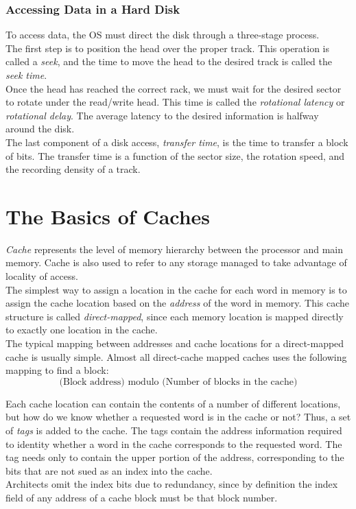 \documentclass[12pt]{article}
\theoremstyle{definition}
\begin{document}
  \subsubsection{Accessing Data in a Hard Disk}
  To access data, the OS must direct the disk through a three-stage process. \\

  The first step is to position the head over the proper track.
  This operation is called a \emph{seek}, and the time to move the head to the desired track is called the \emph{seek time}. \\

  Once the head has reached the correct rack, we must wait for the desired sector to rotate under the read/write head. This time is called the \emph{rotational latency} or \emph{rotational delay}.
  The average latency to the desired information is halfway around the disk. \\

  The last component of a disk access, \emph{transfer time}, is the time to transfer a block of bits.
  The transfer time is a function of the sector size, the rotation speed, and the recording density of a track.

  \section{The Basics of Caches}
  \emph{Cache} represents the level of memory hierarchy between the processor and main memory.
  Cache is also used to refer to any storage managed to take advantage of locality of access. \\

  The simplest way to assign a location in the cache for each word in memory is to assign the cache location based on the \emph{address} of the word in memory.
  This cache structure is called \emph{direct-mapped}, since each memory location is mapped directly to exactly one location in the cache. \\
  The typical mapping between addresses and cache locations for a direct-mapped cache is usually simple.
  Almost all direct-cache mapped caches uses the following mapping to find a block:
  $$\text{(Block address) modulo (Number of blocks in the cache)}$$

  Each cache location can contain the contents of a number of different locations, but how do we know whether a requested word is in the cache or not?
  Thus, a set of \emph{tags} is added to the cache.
  The tags contain the address information required to identity whether a word in the cache corresponds to the requested word.
  The tag needs only to contain the upper portion of the address, corresponding to the bits that are not sued as an index into the cache. \\
  Architects omit the index bits due to redundancy, since by definition the index field of any address of a cache block must be that block number. \\
\end{document}
